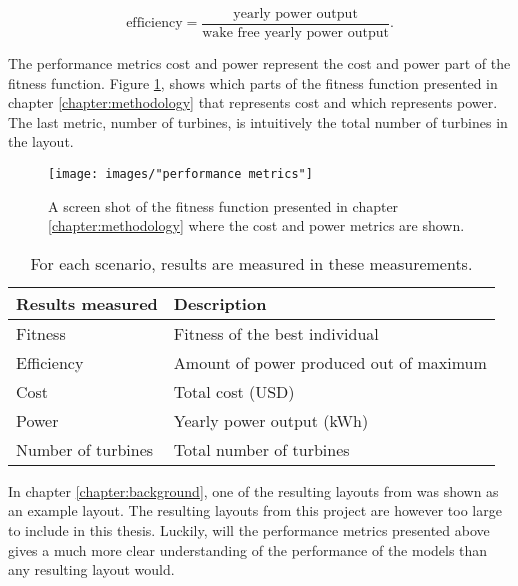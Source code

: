 \begin{equation}
\textrm{efficiency} = \frac{\textrm{yearly power output}}{\textrm{wake free yearly power output}}.
\label{equation:efficiency}
\end{equation}

\noindent The performance metrics cost and power represent the cost and power part of the fitness function. Figure \ref{figure:performance metrics cost and power}, shows which parts of the fitness function presented in chapter \ref{chapter:methodology} that represents cost and which represents power. The last metric, number of turbines, is intuitively the total number of turbines in the layout.\\ 

\begin{figure}[h!]
\begin{center}
\texttt{[image: images/"performance metrics"]}
\caption{A screen shot of the fitness function presented in chapter \ref{chapter:methodology} where the cost and power metrics are shown.}
\label{figure:performance metrics cost and power}
\end{center}
\end{figure}

\begin{table}[h!]
\centering
\caption{For each scenario, results are measured in these measurements.}
\label{table:performance metrics}
\centering
\begin{tabular}{l|l}
\textbf{Results measured}   & \textbf{Description} \\
\hline
Fitness                     & Fitness of the best individual \\
Efficiency                  & Amount of power produced out of maximum \\
Cost                        & Total cost (USD)\\
Power                       & Yearly power output (kWh) \\
Number of turbines          & Total number of turbines
\end{tabular}
\end{table}

\noindent In chapter \ref{chapter:background}, one of the resulting layouts from \citep{Grady} was shown as an example layout. The resulting layouts from this project are however too large to include in this thesis. Luckily, will the performance metrics presented above gives a much more clear understanding of the performance of the models than any resulting layout would. \\


